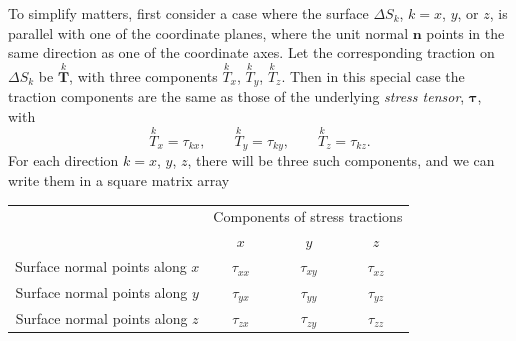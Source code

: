 \documentclass[twoside,11pt]		{report}
\begin{document}
To simplify matters, first consider a case where the surface $\Delta
S_k$, $k=x$, $y$, or $z$, is parallel with one of the coordinate
planes, \ie where the unit normal $\bm{n}$ points in the same
direction as one of the coordinate axes.  Let the corresponding
traction on $\Delta S_k$ be $\stackrel{k}{\bm{T}}$, with three
components $\stackrel{k}{T}_x$, $\stackrel{k}{T}_y$,
$\stackrel{k}{T}_z$. Then in this special case the traction components
are the same as those of the underlying \emph{stress tensor},
$\bm{\tau}$, with
\begin{equation}
\stackrel{k}{T}_x=\tau_{kx}, \qquad
\stackrel{k}{T}_y=\tau_{ky}, \qquad
\stackrel{k}{T}_z=\tau_{kz}.
\end{equation}
For each direction $k=x$, $y$, $z$, there will be three such
components, and we can write them in a square matrix array
\begin{center}
\begin{tabular}{cccc}
& \multicolumn{3}{c}{Components of stress tractions}\\
& \hspace*{3ex}$x$\hspace*{2ex}&\hspace*{2ex}$y$\hspace*{2ex}&\hspace*{2ex}$z$\hspace*{3ex}\\
Surface normal points along $x$ &\hspace*{3ex}$\tau_{xx}$\hspace*{2ex}&\hspace*{2ex}$\tau_{xy}$\hspace*{2ex}&\hspace*{2ex}
$\tau_{xz}$\hspace*{3ex}\\
Surface normal points along $y$ &\hspace*{3ex}$\tau_{yx}$\hspace*{2ex}&\hspace*{2ex}$\tau_{yy}$\hspace*{2ex}&\hspace*{2ex}
$\tau_{yz}$\hspace*{3ex}\\
Surface normal points along $z$ &\hspace*{3ex}$\tau_{zx}$\hspace*{2ex}&\hspace*{2ex}$\tau_{zy}$\hspace*{2ex}&\hspace*{2ex}
$\tau_{zz}$\hspace*{3ex}\\
\end{tabular}
\end{center}
\end{document}
